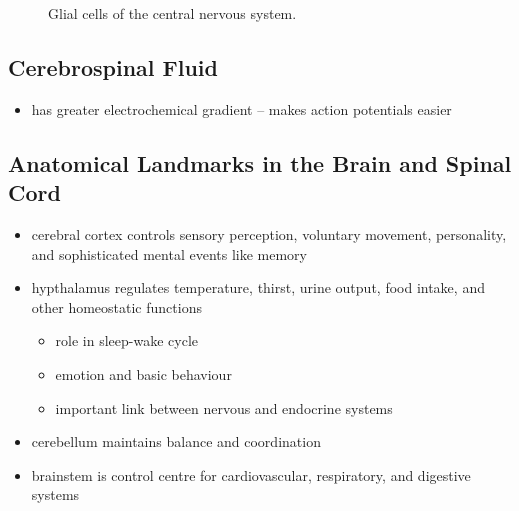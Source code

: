 \documentclass[10pt]{article}
\begin{document}
\begin{itemize}
\begin{figure}[h]
            \caption{Glial cells of the central nervous system.}
            \label{fig:glialCellsCNS}
        \end{figure}
\end{itemize}


\subsection{Cerebrospinal Fluid}
\begin{itemize}
    \item has greater electrochemical gradient -- makes action potentials easier
\end{itemize}


\subsection{Anatomical Landmarks in the Brain and Spinal Cord}
\begin{itemize}
    \item cerebral cortex controls sensory perception, voluntary movement, personality, and sophisticated mental events like memory
    \item hypthalamus regulates temperature, thirst, urine output, food intake, and other homeostatic functions
        \begin{itemize}
            \item role in sleep-wake cycle 
            \item emotion and basic behaviour 
            \item important link between nervous and endocrine systems
        \end{itemize}
    \item cerebellum maintains balance and coordination 
    \item brainstem is control centre for cardiovascular, respiratory, and digestive systems
\end{itemize}
\end{document}
